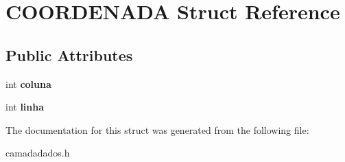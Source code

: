 \hypertarget{structCOORDENADA}{}\section{C\+O\+O\+R\+D\+E\+N\+A\+DA Struct Reference}
\label{structCOORDENADA}
\subsection*{Public Attributes}
\begin{DoxyCompactItemize}
\item 
\mbox{\label{structCOORDENADA_adfbc8d4856ce807139fdf62e00aed29a}} 
int {\bfseries coluna}
\item 
\mbox{\label{structCOORDENADA_aefe14bcc5a066ac3b21500cc3d28c06f}} 
int {\bfseries linha}
\end{DoxyCompactItemize}


The documentation for this struct was generated from the following file\+:\begin{DoxyCompactItemize}
\item 
camadadados.\+h\end{DoxyCompactItemize}
